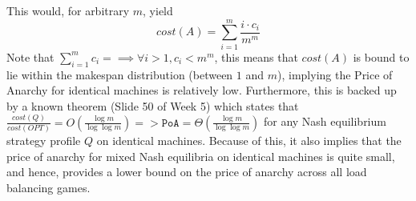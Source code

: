 \begin{enumerate}
    This would, for arbitrary $m$, yield
    \[
        cost(A) = \sum_{i = 1}^{m} \frac{i \cdot c_i}{m^m}
    \]
    Note that $\sum_{i = 1}^{m}{c_i} = \implies \forall i > 1, c_i < m^m$, this means that $cost(A)$ is bound to lie within the makespan distribution (between $1$ and $m$), implying the Price of Anarchy for identical machines is relatively low.
    Furthermore, this is backed up by a known theorem (Slide 50 of Week 5) which states that $\frac{cost(Q)}{cost(OPT)} = O\left(\frac{\log{m}}{\log{\log{m}}}\right) => \texttt{PoA} = \Theta \left(\frac{\log{m}}{\log{\log{m}}}\right)$ for any Nash equilibrium strategy profile $Q$ on identical machines.
    Because of this, it also implies that the price of anarchy for mixed Nash equilibria on identical machines is quite small, and hence, provides a lower bound on the price of anarchy across all load balancing games.

\end{enumerate}
\vspace*{0.8cm}
